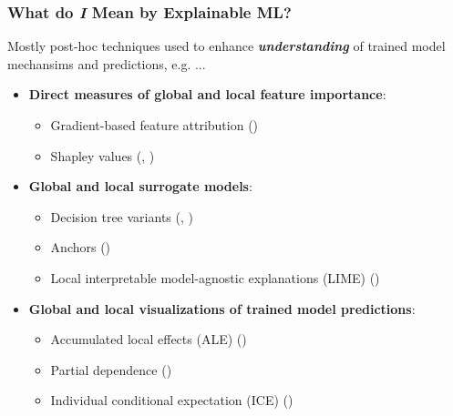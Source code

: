 \documentclass[11pt,
               aspectratio=169,
               hyperref={colorlinks}
               ]{beamer}
\begin{document}
	\begin{frame}
	
		\frametitle{What do \textit{\textbf{I}} Mean by Explainable ML?}

		Mostly post-hoc techniques used to enhance \textit{\textbf{understanding}} of trained model mechansims and predictions, e.g. ...
		\begin{itemize}
			\item \textbf{Direct measures of global and local feature importance}: 
			\begin{itemize}\footnotesize
				\item Gradient-based feature attribution (\citet{grad_attr})
				\item Shapley values (\citet{shapley}, \citet{shapley1953value})
			\end{itemize}
			\item \textbf{Global and local surrogate models}: 
			\begin{itemize}\footnotesize
				\item Decision tree variants (\citet{viper}, \citet{dt_surrogate1})
				\item Anchors (\citet{anchors})
				\item Local interpretable model-agnostic explanations (LIME) (\citet{lime})
			\end{itemize}
			\item \textbf{Global and local visualizations of trained model predictions}: 
			\begin{itemize}\footnotesize
				\item Accumulated local effects (ALE) (\citet{ale_plot}) 
				\item Partial dependence (\citet{esl})
				\item Individual conditional expectation (ICE) (\citet{ice_plots})
			\end{itemize}
		\end{itemize}\normalsize
			
	\end{frame}
\end{document}
